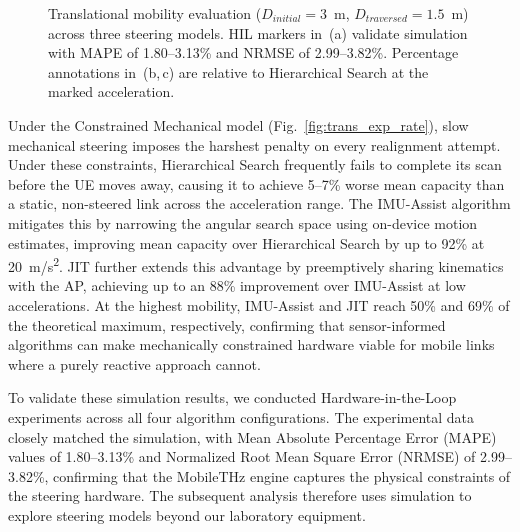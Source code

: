 \documentclass[fleqn,10pt]{wlscirep}
\newcommand{\legmark}[2]{%
    \tikz[baseline=-0.5ex]{
        \node[#2, fill=#1, draw=#1, inner sep=2pt, scale=0.8] at (0,0) {};
    }%
}
\begin{document}
\begin{figure}[ht!]
    
    \caption{Translational mobility evaluation ($D_{initial} = 3$~m, $D_{traversed} = 1.5$~m) across three steering models. HIL markers in~(a) validate simulation with MAPE of 1.80--3.13\% and NRMSE of 2.99--3.82\%. Percentage annotations in~(b,\,c) are relative to Hierarchical Search at the marked acceleration.}
    \label{fig:translational_rate}
    \vspace{-5pt}
\end{figure}

Under the Constrained Mechanical model (Fig.~\ref{fig:trans_exp_rate}), slow mechanical steering imposes the harshest penalty on every realignment attempt. Under these constraints, Hierarchical Search frequently fails to complete its scan before the UE moves away, causing it to achieve 5–7\% worse mean capacity than a static, non-steered link across the acceleration range. The IMU-Assist algorithm mitigates this by narrowing the angular search space using on-device motion estimates, improving mean capacity over Hierarchical Search by up to 92\% at \SI{20}{m/s^2}. JIT further extends this advantage by preemptively sharing kinematics with the AP, achieving up to an 88\% improvement over IMU-Assist at low accelerations. At the highest mobility, IMU-Assist and JIT reach 50\% and 69\% of the theoretical maximum, respectively, confirming that sensor-informed algorithms can make mechanically constrained hardware viable for mobile links where a purely reactive approach cannot.

To validate these simulation results, we conducted Hardware-in-the-Loop experiments across all four algorithm configurations. The experimental data closely matched the simulation, with Mean Absolute Percentage Error (MAPE) values of 1.80--3.13\% and Normalized Root Mean Square Error (NRMSE) of 2.99--3.82\%, confirming that the MobileTHz engine captures the physical constraints of the steering hardware. The subsequent analysis therefore uses simulation to explore steering models beyond our laboratory equipment.
\end{document}
